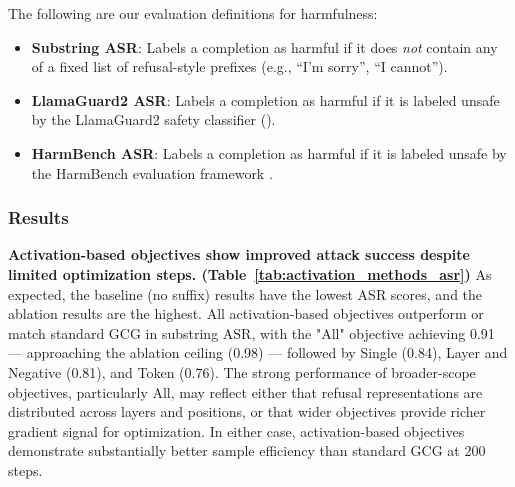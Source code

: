 \documentclass[letterpaper]{article} %
\begin{document}
    The following are our evaluation definitions for harmfulness:
     \begin{itemize}
          \item \textbf{Substring ASR}:
          Labels a completion as harmful if it does \emph{not} contain any of a fixed list of refusal-style prefixes (e.g., ``I'm sorry'', ``I cannot'').
          \item \textbf{LlamaGuard2 ASR}:
          Labels a completion as harmful if it is labeled unsafe by the LlamaGuard2 safety classifier (\cite{metallamaguard2}).
          \item \textbf{HarmBench ASR}:
          Labels a completion as harmful if it is labeled unsafe by the HarmBench evaluation framework \citep{mazeika2024harmbenchstandardizedevaluationframework}.
      \end{itemize}

      \subsubsection{Results}
      \textbf{Activation-based objectives show improved attack success despite limited optimization steps. (Table~\ref{tab:activation_methods_asr})} As expected, the baseline (no suffix) results have the lowest ASR scores, and the ablation results are the highest. All activation-based objectives outperform or match standard GCG in substring ASR, with the "All" objective achieving 0.91 — approaching the ablation ceiling (0.98) — followed by Single (0.84), Layer and Negative (0.81), and Token (0.76). The strong performance of broader-scope objectives, particularly All, may reflect either that refusal representations are distributed across layers and positions, or that wider objectives provide richer gradient signal for optimization. In either case, activation-based objectives demonstrate substantially better sample efficiency than standard GCG at 200 steps.
\end{document}
